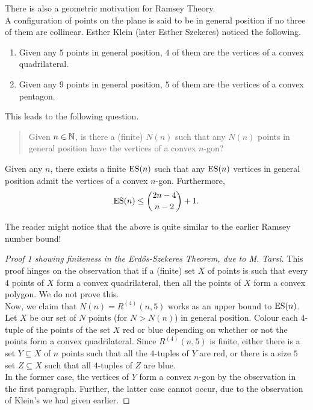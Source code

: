 	 There is also a geometric motivation for Ramsey Theory.\\
	 A configuration of points on the plane is said to be in general position if no three of them are collinear. Esther Klein (later Esther Szekeres) noticed the following.
	 \begin{enumerate}
	 	\item Given any $5$ points in general position, $4$ of them are the vertices of a convex quadrilateral.
	 	\item Given any $9$ points in general position, $5$ of them are the vertices of a convex pentagon.
	 \end{enumerate}
	 This leads to the following question.\\
	 \begin{quote}
	 	Given $n\in\mathbb{N}$, is there a (finite) $N(n)$ such that any $N(n)$ points in general position have the vertices of a convex $n$-gon?
	 \end{quote}

	 \begin{ftheo}
	 	Given any $n$, there exists a finite $\operatorname{ES}(n)$ such that any $\operatorname{ES}(n)$ vertices in general position admit the vertices of a convex $n$-gon. Furthermore,
	 	\[ \operatorname{ES}(n) \le \binom{2n-4}{n-2} + 1. \]
	 \end{ftheo}

	 The reader might notice that the above is quite similar to the earlier Ramsey number bound!\\

	 \begin{proof}[Proof 1 showing finiteness in the Erd\H{o}s-Szekeres Theorem, due to M. Tarsi]
	 	This proof hinges on the observation that if a (finite) set $X$ of points is such that every $4$ points of $X$ form a convex quadrilateral, then all the points of $X$ form a convex polygon. We do not prove this.\\
	 	Now, we claim that $N(n) = R^{(4)}(n,5)$ works as an upper bound to $\operatorname{ES}(n)$. Let $X$ be our set of $N$ points (for $N > N(n)$) in general position. Colour each $4$-tuple of the points of the set $X$ red or blue depending on whether or not the points form a convex quadrilateral. Since $R^{(4)}(n,5)$ is finite, either there is a set $Y\subseteq X$ of $n$ points such that all the $4$-tuples of $Y$ are red, or there is a size $5$ set $Z\subseteq X$ such that all $4$-tuples of $Z$ are blue.\\
	 	In the former case, the vertices of $Y$ form a convex $n$-gon by the observation in the first paragraph. Further, the latter case cannot occur, due to the observation of Klein's we had given earlier.
	 \end{proof}

